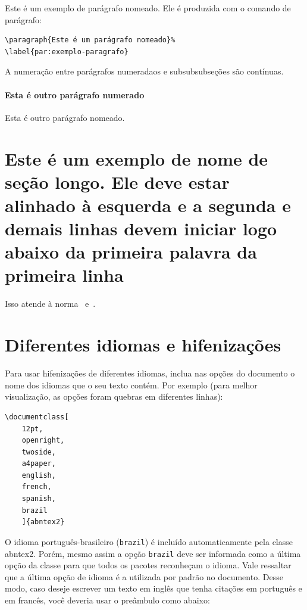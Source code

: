 Este é um exemplo de parágrafo nomeado. Ele é produzida com o comando de
parágrafo:

\begin{verbatim}
\paragraph{Este é um parágrafo nomeado}%
\label{par:exemplo-paragrafo}
\end{verbatim}

A numeração entre parágrafos numeradaos e subsubsubseções são contínuas.

\paragraph{Esta é outro parágrafo numerado}%
\label{par:exemplo-paragrafo-outro}

Esta é outro parágrafo nomeado.

\section{Este é um exemplo de nome de seção longo. Ele deve estar
alinhado à esquerda e a segunda e demais linhas devem iniciar logo abaixo da
primeira palavra da primeira linha}

Isso atende à norma~
e~.

\section{Diferentes idiomas e hifenizações}%
\label{sec:hifenizacao}

Para usar hifenizações de diferentes idiomas, inclua nas opções do documento o
nome dos idiomas que o seu texto contém. Por exemplo (para melhor
visualização, as opções foram quebras em diferentes linhas):

\begin{verbatim}
\documentclass[
    12pt,
    openright,
    twoside,
    a4paper,
    english,
    french,
    spanish,
    brazil
    ]{abntex2}
\end{verbatim}

O idioma português-brasileiro (\texttt{brazil}) é incluído automaticamente pela
classe \textsf{abntex2}. Porém, mesmo assim a opção \texttt{brazil} deve ser
informada como a última opção da classe para que todos os pacotes reconheçam o
idioma. Vale ressaltar que a última opção de idioma é a utilizada por padrão no
documento. Desse modo, caso deseje escrever um texto em inglês que tenha
citações em português e em francês, você deveria usar o preâmbulo como abaixo:


